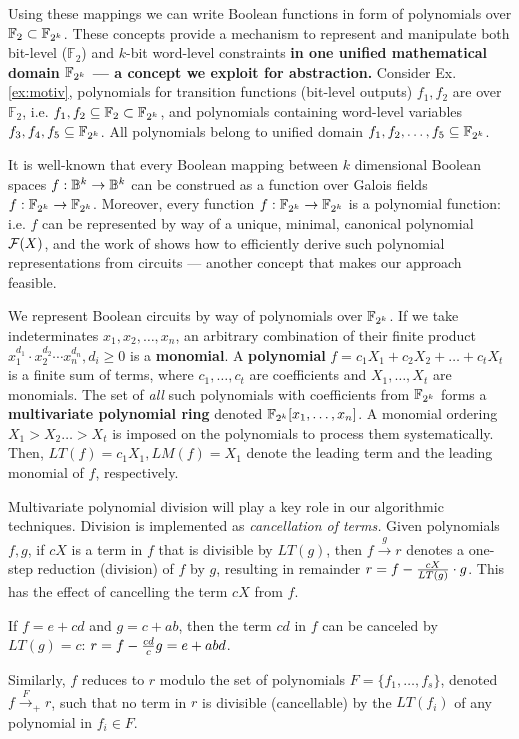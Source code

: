 Using these mappings we can write Boolean functions in form of
polynomials over $\mathbb F_2\subset {\mathbb{F}}_{2^k}$. 
These concepts provide a mechanism to represent and
manipulate both bit-level ($\mathbb{F}_2$) and $k$-bit word-level
constraints {\bf in one unified mathematical domain ${\mathbb{F}}_{2^k}$ --- a
  concept we   exploit for abstraction. }
  Consider Ex.\ref{ex:motiv},
polynomials for transition functions (bit-level outputs) $f_1,f_2$
are over $\mathbb F_2$, i.e. $f_1,f_2\subseteq \mathbb F_2 \subset {\mathbb{F}}_{2^k}$,
and polynomials containing word-level variables $f_3,f_4,f_5 \subseteq {\mathbb{F}}_{2^k}$.
All polynomials belong to unified domain $f_1,f_2,\dots,f_5 \subseteq {\mathbb{F}}_{2^k}$.

It is well-known that every Boolean mapping between $k$ dimensional
Boolean spaces $f: {\mathbb{B}}^k \rightarrow {\mathbb{B}}^k$ can be construed as a
function over Galois fields $f: {\mathbb{F}}_{2^k} \rightarrow {\mathbb{F}}_{2^k}$. Moreover,
every function $f: {\mathbb{F}}_{2^k} \rightarrow {\mathbb{F}}_{2^k}$ is a polynomial function: 
i.e. $f$ can be represented by way of a unique, minimal, canonical
polynomial ${\mathcal{F}}(X)$, and the work of \cite{timDAC} shows how to
efficiently derive such polynomial representations from circuits ---
another concept that makes our approach feasible. 


We represent Boolean circuits by way of polynomials over
${\mathbb{F}}_{2^k}$. If we take indeterminates $x_1,x_2,\dots,x_n$, an arbitrary
combination of their finite product  
$x_1^{d_1}\cdot x_2^{d_2}\cdots x_n^{d_n}, d_i\geq 0$ 
is a {\bf monomial}. A {\bf polynomial} $f = c_1 X_1 + c_2 X_2 + \dots
+ c_t X_t$ is a finite sum of terms, where $c_1, \dots, c_t$ are
coefficients and $X_1, \dots, X_t$ are monomials. The set of {\it all}
such polynomials with coefficients from ${\mathbb{F}}_{2^k}$ forms a {\bf
  multivariate polynomial ring} denoted ${\mathbb{F}}_{2^k}[x_1,\dots,x_n]$. 
A monomial ordering $X_1 > X_2 \dots > X_t$ is imposed on the
polynomials to process them systematically. Then, $LT(f) = c_1 X_1,
LM(f) = X_1$ denote the leading term and the leading monomial of $f$,
respectively. 


Multivariate polynomial division will play a key role in our
algorithmic techniques. Division is implemented as {\it cancellation
  of terms.} Given polynomials $f, g$, if $cX$ is a term in
$f$ that is divisible by $LT(g)$, then $f \xrightarrow{g} r$ denotes a
one-step reduction (division) of $f$ by $g$, resulting in remainder $r
= f - {{cX} \over {LT(g)}} \cdot g$. This has the effect of cancelling
the term $cX$ from $f$. 
\begin{example}
\label{ex:multidiv}
If $f = e + cd$ and $g = c + ab$,
then the term $cd$ in $f$ can be canceled by $LT(g) = c$: $r = f - {cd
  \over c} g = e + abd$. 
\end{example}
  Similarly, $f$ reduces to $r$ modulo the set
of polynomials $F = \{f_1, \dots, f_s\}$, denoted $f \stackrel{F}
{\textstyle   \longrightarrow}_+ r$, such that no term in $r$ is
divisible (cancellable) by the $LT(f_i)$ of any polynomial in $ f_i
\in F$.    


